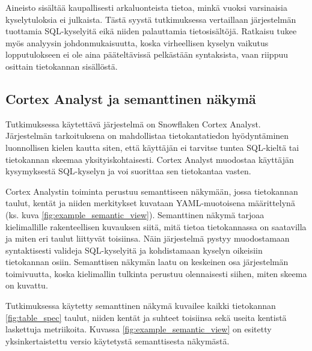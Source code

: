Aineisto sisältää kaupallisesti arkaluonteista tietoa, minkä vuoksi varsinaisia kyselytuloksia ei julkaista. Tästä syystä tutkimuksessa vertaillaan järjestelmän tuottamia SQL-kyselyitä eikä niiden palauttamia tietosisältöjä. Ratkaisu tukee myös analyysin johdonmukaisuutta, koska virheellisen kyselyn vaikutus lopputulokseen ei ole aina pääteltävissä pelkästään syntaksista, vaan riippuu osittain tietokannan sisällöstä.

\subsection{Cortex Analyst ja semanttinen näkymä}
Tutkimuksessa käytettävä järjestelmä on Snowflaken Cortex Analyst. Järjestelmän tarkoituksena on mahdollistaa tietokantatiedon hyödyntäminen luonnollisen kielen kautta siten, että käyttäjän ei tarvitse tuntea SQL-kieltä tai tietokannan skeemaa yksityiskohtaisesti. Cortex Analyst muodostaa käyttäjän kysymyksestä SQL-kyselyn ja voi suorittaa sen tietokantaa vasten.

Cortex Analystin toiminta perustuu semanttiseen näkymään, jossa tietokannan taulut, kentät ja niiden merkitykset kuvataan YAML-muotoisena määrittelynä (ks. kuva \ref{fig:example_semantic_view}). Semanttinen näkymä tarjoaa kielimallille rakenteellisen kuvauksen siitä, mitä tietoa tietokannassa on saatavilla ja miten eri taulut liittyvät toisiinsa. Näin järjestelmä pystyy muodostamaan syntaktisesti valideja SQL-kyselyitä ja kohdistamaan kyselyn oikeisiin tietokannan osiin. Semanttisen näkymän laatu on keskeinen osa järjestelmän toimivuutta, koska kielimallin tulkinta perustuu olennaisesti siihen, miten skeema on kuvattu.

Tutkimuksessa käytetty semanttinen näkymä kuvailee kaikki tietokannan \ref{fig:table_spec} taulut, niiden kentät ja suhteet toisiinsa sekä useita kentistä laskettuja metriikoita. Kuvassa \ref{fig:example_semantic_view} on esitetty yksinkertaistettu versio käytetystä semanttisesta näkymästä.


